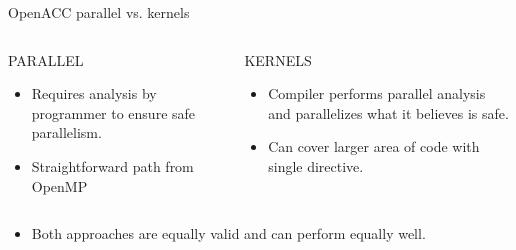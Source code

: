 \documentclass[c,mathserif,compress,xcolor=svgnames]{beamer}
\newenvironment{bblock}[0]
{
\begin{beamerboxesrounded}[upper=uppercol1,lower=lowercol1,shadow=true]}
{\end{beamerboxesrounded}}
\begin{document}
\begin{frame}{\small OpenACC parallel vs. kernels}
  \begin{columns}
    \begin{bblock}{PARALLEL}
      \begin{itemize}
        \item Requires analysis by programmer to ensure safe parallelism.
        \item Straightforward path from OpenMP
      \end{itemize}
    \end{bblock}
    \begin{bblock}{KERNELS}
      \begin{itemize}
        \item Compiler performs parallel analysis and parallelizes what it believes is safe.
        \item Can cover larger area of code with single directive.
      \end{itemize}
    \end{bblock}
  \end{columns}
  \begin{itemize}
    \item[] Both approaches are equally valid and can perform equally well.
  \end{itemize}
\end{frame}

\begin{frame}[fragile]
  \begin{columns}[t]
     
     
  \end{columns}
\end{frame}
\end{document}
